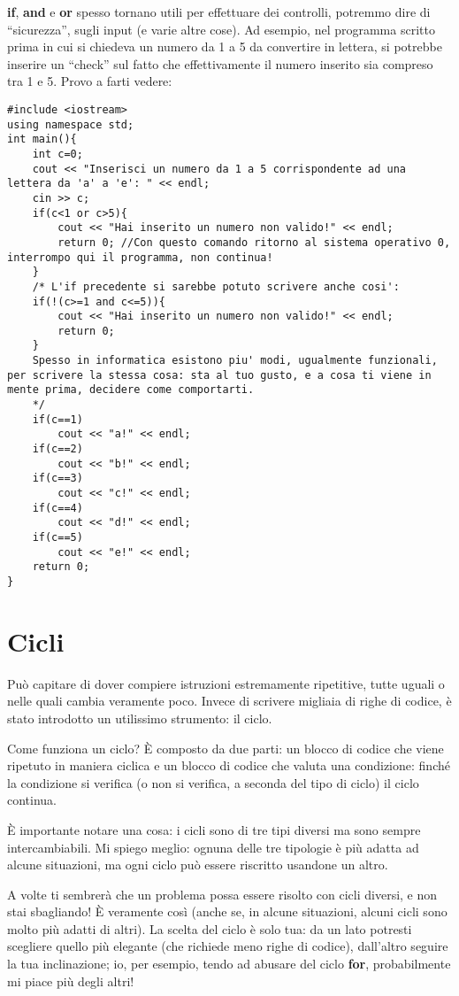 	\textbf{if}, \textbf{and} e \textbf{or} spesso tornano utili per effettuare dei controlli, potremmo dire di ``sicurezza'', sugli input (e varie altre cose). Ad esempio, nel programma scritto prima in cui si chiedeva un numero da 1 a 5 da convertire in lettera, si potrebbe inserire un ``check'' sul fatto che effettivamente il numero inserito sia compreso tra 1 e 5. Provo a farti vedere:
	\begin{lstlisting}
#include <iostream>
using namespace std;
int main(){
	int c=0;
	cout << "Inserisci un numero da 1 a 5 corrispondente ad una lettera da 'a' a 'e': " << endl;
	cin >> c;
	if(c<1 or c>5){
		cout << "Hai inserito un numero non valido!" << endl;
		return 0; //Con questo comando ritorno al sistema operativo 0, interrompo qui il programma, non continua!
	}
	/* L'if precedente si sarebbe potuto scrivere anche cosi':
	if(!(c>=1 and c<=5)){
		cout << "Hai inserito un numero non valido!" << endl;
		return 0;
	}
	Spesso in informatica esistono piu' modi, ugualmente funzionali, per scrivere la stessa cosa: sta al tuo gusto, e a cosa ti viene in mente prima, decidere come comportarti.
	*/
	if(c==1)
		cout << "a!" << endl;
	if(c==2)
		cout << "b!" << endl;
	if(c==3)
		cout << "c!" << endl;
	if(c==4)
		cout << "d!" << endl;
	if(c==5)
		cout << "e!" << endl;
	return 0;
}
	\end{lstlisting}
	
	\section{Cicli}
	Può capitare di dover compiere istruzioni estremamente ripetitive, tutte uguali o nelle quali cambia veramente poco. Invece di scrivere migliaia di righe di codice, è stato introdotto un utilissimo strumento: il ciclo.
	
	Come funziona un ciclo? \`E composto da due parti: un blocco di codice che viene ripetuto in maniera ciclica e un blocco di codice che valuta una condizione: finché la condizione si verifica (o non si verifica, a seconda del tipo di ciclo) il ciclo continua. 
	
	\`E importante notare una cosa: i cicli sono di tre tipi diversi ma sono sempre intercambiabili. Mi spiego meglio: ognuna delle tre tipologie è più adatta ad alcune situazioni, ma ogni ciclo può essere riscritto usandone un altro. 
	
	A volte ti sembrerà che un problema possa essere risolto con cicli diversi, e non stai sbagliando! \`E veramente così (anche se, in alcune situazioni, alcuni cicli sono molto più adatti di altri). La scelta del ciclo è solo tua: da un lato potresti scegliere quello più elegante (che richiede meno righe di codice), dall'altro seguire la tua inclinazione; io, per esempio, tendo ad abusare del ciclo \textbf{for}, probabilmente mi piace più degli altri!
	
